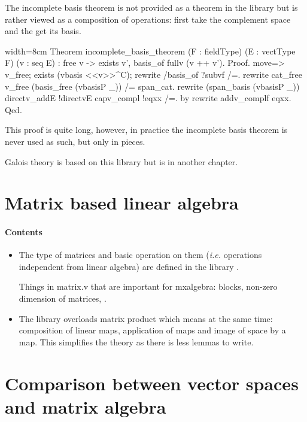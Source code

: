The incomplete basis theorem is not provided as a theorem in the
library but is rather viewed as a composition of operations: first
take the complement space and the get its basis.

\begin{coq}{}{width=8cm}
Theorem incomplete_basis_theorem (F : fieldType) (E : vectType F) (v : seq E) :
  free v -> exists v', basis_of fullv (v ++ v').
Proof.
move=> v_free; exists (vbasis <<v>>^C); rewrite /basis_of ?subvf /=.
rewrite cat_free v_free (basis_free (vbasisP _)) /= span_cat.
rewrite (span_basis (vbasisP _)) directv_addE !directvE capv_compl !eqxx /=.
by rewrite addv_complf eqxx.
Qed.
\end{coq}

This proof is quite long, however, in practice the incomplete basis
theorem is never used as such, but only in pieces.

Galois theory is based on this library but is in another chapter.

\section{Matrix based linear algebra}
\label{sec:matrix-based-linear}

\paragraph{Contents}

\begin{itemize}
\item The type of matrices and basic operation on them (\textit{i.e.}
  operations independent from linear algebra) are defined in the
  library . 

  Things in matrix.v that are important for mxalgebra: blocks,
  non-zero dimension of matrices, .

\item The library  overloads matrix product
  which means at the same time: composition of linear maps,
  application of maps and image of space by a map. This simplifies the
  theory as there is less lemmas to write.

\end{itemize}


\section{Comparison between vector spaces and matrix algebra}
\label{sec:comp-betw-vect}

